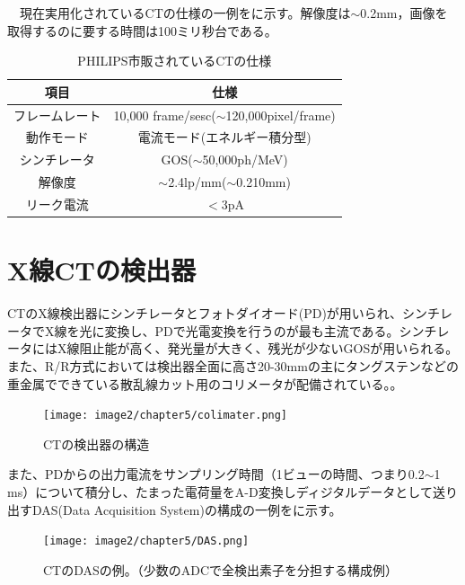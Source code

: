 \ \ 現在実用化されているCTの仕様の一例をに示す。解像度は$\sim$0.2mm，画像を取得するのに要する時間は100ミリ秒台である。
\begin{table}[H]
\begin{center}
\begin{tabular}{cc} \hline
項目 & 仕様 \\\hline
フレームレート & 10,000 frame/sesc($\sim$120,000pixel/frame) \\
動作モード & 電流モード(エネルギー積分型) \\
シンチレータ & GOS($\sim$50,000ph/MeV) \\
解像度 & $\sim$2.4lp/mm($\sim$0.210mm) \\
リーク電流 & $<3$pA \\\hline
\end{tabular}
\end{center}
\caption{PHILIPS市販されているCTの仕様\cite{philips}}
\label{CT_philips}
\end{table}



\section{X線CTの検出器}
CTのX線検出器にシンチレータとフォトダイオード(PD)が用いられ、シンチレータでX線を光に変換し、PDで光電変換を行うのが最も主流である。シンチレータにはX線阻止能が高く、発光量が大きく、残光が少ないGOSが用いられる。また、R/R方式においては検出器全面に高さ20-30mmの主にタングステンなどの重金属でできている散乱線カット用のコリメータが配備されている。。

\begin{figure}[H]
 \begin{center}
 \texttt{[image: image2/chapter5/colimater.png]} 
 \end{center}
 \caption{CTの検出器の構造\cite{mori}}
 \label{fig:colimater}
\end{figure}

また、PDからの出力電流をサンプリング時間（1ビューの時間、つまり0.2$\sim$1 ms）について積分し、たまった電荷量をA-D変換しディジタルデータとして送り出すDAS(Data Acquisition System)の構成の一例をに示す。

\begin{figure}[H]
 \begin{center}
 \texttt{[image: image2/chapter5/DAS.png]} 
 \end{center}
 \caption{CTのDASの例。（少数のADCで全検出素子を分担する構成例）\cite{mori}}
 \label{fig:DAS}
\end{figure}


